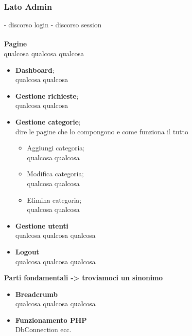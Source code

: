 \subsubsection{Lato Admin}
- discorso login
- discorso session\\\\
\textbf{Pagine}\\ qualcosa qualcosa qualcosa
	\begin{itemize}
		\item \textbf{Dashboard};\\qualcosa qualcosa
		\item \textbf{Gestione richieste};\\qualcosa qualcosa
		\item \textbf{Gestione categorie};\\dire le pagine che lo compongono e come funziona il tutto
	 	\begin{itemize}
 			\item Aggiungi categoria;\\qualcosa qualcosa
 			\item Modifica categoria;\\qualcosa qualcosa
 			\item Elimina categoria;\\qualcosa qualcosa
	 	\end{itemize}
 	\item \textbf{Gestione utenti}\\qualcosa qualcosa qualcosa
 	\item \textbf{Logout}\\qualcosa qualcosa qualcosa\\
 	\end{itemize}
\textbf{Parti fondamentali -> troviamoci un sinonimo} \\
\begin{itemize}
	\item \textbf{Breadcrumb}\\	qualcosa qualcosa qualcosa
	\item \textbf{Funzionamento PHP}\\	DbConnection ecc.
\end{itemize}